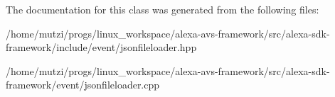 The documentation for this class was generated from the following files\+:\begin{DoxyCompactItemize}
\item 
/home/mutzi/progs/linux\+\_\+workspace/alexa-\/avs-\/framework/src/alexa-\/sdk-\/framework/include/event/jsonfileloader.\+hpp\item 
/home/mutzi/progs/linux\+\_\+workspace/alexa-\/avs-\/framework/src/alexa-\/sdk-\/framework/event/jsonfileloader.\+cpp\end{DoxyCompactItemize}
